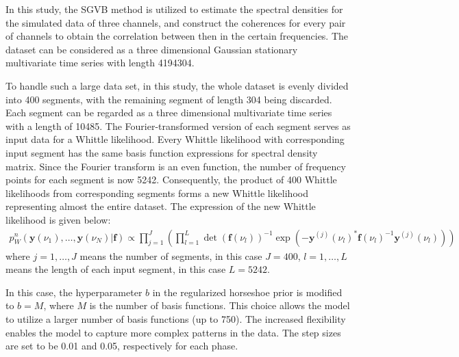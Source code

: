 \documentclass[12pt,a4paper]{article}
\begin{document}
In this study, the SGVB method is utilized to estimate the spectral densities for the simulated data of three channels, and construct the coherences for every pair of channels to obtain the correlation between then in the certain frequencies. The dataset can be considered as a  three dimensional Gaussian stationary multivariate time series with length 4194304.

To handle such a large data set, in this study, the whole dataset is evenly divided into 400 segments, with the remaining segment of length 304 being discarded. Each segment can be regarded as a three dimensional multivariate time series with a length of 10485. The Fourier-transformed version of each segment serves as input data for a Whittle likelihood. Every Whittle likelihood with corresponding input segment has the same basis function expressions for spectral density matrix. Since the Fourier transform is an even function, the number of frequency points for each segment is now 5242. Consequently, the product of 400 Whittle likelihoods from corresponding segments forms a new Whittle likelihood representing almost the entire dataset. The expression of the new Whittle likelihood is given below:
\begin{align}
p^{n}_W(\mathbf{y}(\nu_1), \ldots, \mathbf{y}(\nu_N)| \bm{f}) \propto 
\prod_{j=1}^{J} \left(\prod_{l=1}^{L} \det(\bm{f}(\nu_l))^{-1} \exp\left(-\mathbf{y}^{(j)}(\nu_l)^* \bm{f}(\nu_l)^{-1} \mathbf{y}^{(j)}(\nu_l)\right)\right)
\end{align}
where $j = 1, \dots, J$ means the number of segments, in this case $J = 400$, $l = 1, \dots, L$ means the length of each input segment, in this case $L = 5242$.

In this case, the hyperparameter $b$ in the regularized horseshoe prior is modified to $b=M$, where $M$ is the number of basis functions. This choice allows the model to utilize a larger number of basis functions (up to 750). The increased flexibility enables the model to capture more complex patterns in the data. The step sizes are set to be 0.01 and 0.05, respectively for each phase.
\end{document}
